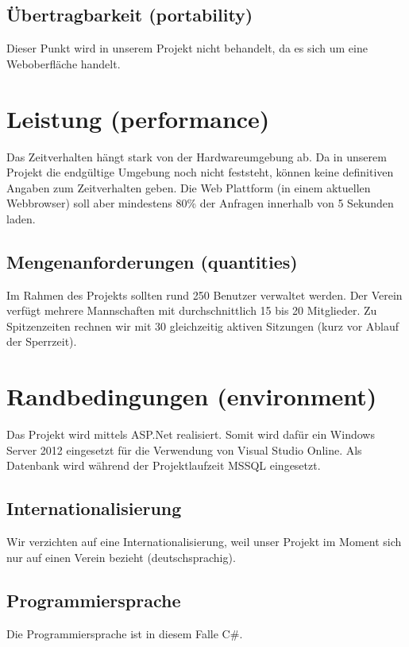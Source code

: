 	\subsection {Übertragbarkeit (portability)}
	Dieser Punkt wird in unserem Projekt nicht behandelt, da es sich um eine Weboberfläche handelt.
	
	\section{Leistung (performance)}
	Das Zeitverhalten hängt stark von der Hardwareumgebung ab. Da in unserem Projekt die endgültige Umgebung noch nicht feststeht, können keine definitiven Angaben zum Zeitverhalten geben. Die Web Plattform (in einem aktuellen Webbrowser) soll aber mindestens 80\% der Anfragen innerhalb von 5 Sekunden laden. 
	
	\subsection{Mengenanforderungen (quantities)}
	Im Rahmen des Projekts sollten rund 250 Benutzer verwaltet werden. Der Verein verfügt mehrere Mannschaften mit durchschnittlich 15 bis 20 Mitglieder. 
	Zu Spitzenzeiten rechnen wir mit 30 gleichzeitig aktiven Sitzungen (kurz vor Ablauf der Sperrzeit).  
		
	\section{Randbedingungen (environment)}
	Das Projekt wird mittels ASP.Net realisiert. Somit wird dafür ein Windows Server 2012 eingesetzt für die Verwendung von Visual Studio Online. Als Datenbank wird während der Projektlaufzeit MSSQL eingesetzt.
	
	\subsection{Internationalisierung}
	Wir verzichten auf eine Internationalisierung, weil unser Projekt im Moment sich nur auf einen Verein bezieht (deutschsprachig).
	
	\subsection{Programmiersprache}
	Die Programmiersprache ist in diesem Falle C\#.

	
